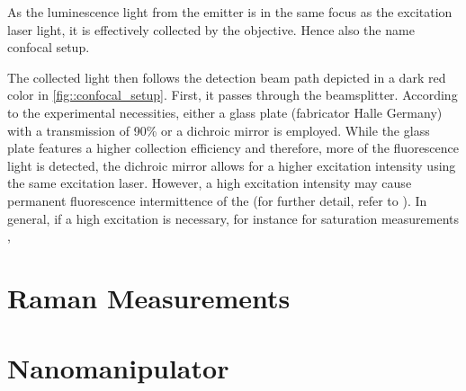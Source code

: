 	As the luminescence light from the emitter is in the same focus as the excitation laser light, it is effectively collected by the objective.
	Hence also the name confocal setup.

	The collected light then follows the detection beam path depicted in a dark red color in \autoref{fig::confocal_setup}.
	First, it passes through the beamsplitter.
	According to the experimental necessities, either a  glass plate (fabricator Halle Germany) with a transmission of 90\% or a dichroic mirror is employed.
	While the glass plate features a higher collection efficiency and therefore, more of the fluorescence light is detected, the dichroic mirror allows for a higher excitation intensity using the same excitation laser. 
	However, a high excitation intensity may cause permanent fluorescence intermittence of the \sivs (for further detail, refer to ).
	In general, if a high excitation is necessary, for instance for saturation measurements , 


	\section{Raman Measurements}
	\section{Nanomanipulator}

